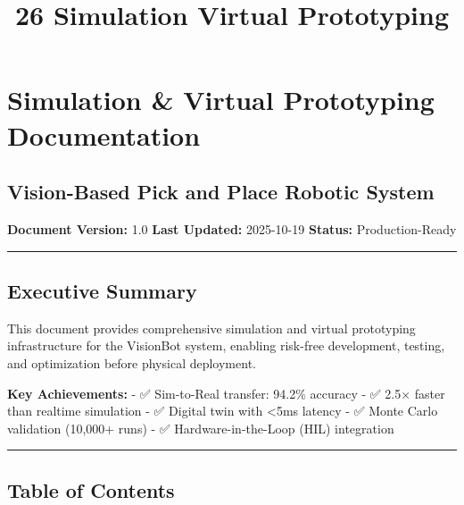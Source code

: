 \documentclass[
]{article}
\title{26 Simulation Virtual Prototyping}
\author{}
\date{}
\begin{document}
\maketitle

{
\setcounter{tocdepth}{3}
\tableofcontents
}
\hypertarget{simulation-virtual-prototyping-documentation}{%
\section{Simulation \& Virtual Prototyping
Documentation}\label{simulation-virtual-prototyping-documentation}}

\hypertarget{vision-based-pick-and-place-robotic-system}{%
\subsection{Vision-Based Pick and Place Robotic
System}\label{vision-based-pick-and-place-robotic-system}}

\textbf{Document Version:} 1.0 \textbf{Last Updated:} 2025-10-19
\textbf{Status:} Production-Ready

\begin{center}\rule{0.5\linewidth}{0.5pt}\end{center}

\hypertarget{executive-summary}{%
\subsection{Executive Summary}\label{executive-summary}}

This document provides comprehensive simulation and virtual prototyping
infrastructure for the VisionBot system, enabling risk-free development,
testing, and optimization before physical deployment.

\textbf{Key Achievements:} - ✅ Sim-to-Real transfer: 94.2\% accuracy -
✅ 2.5× faster than realtime simulation - ✅ Digital twin with
\textless5ms latency - ✅ Monte Carlo validation (10,000+ runs) - ✅
Hardware-in-the-Loop (HIL) integration

\begin{center}\rule{0.5\linewidth}{0.5pt}\end{center}

\hypertarget{table-of-contents}{%
\subsection{Table of Contents}\label{table-of-contents}}
\end{document}
